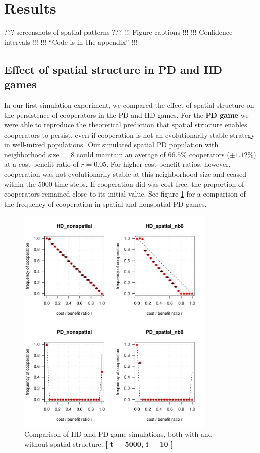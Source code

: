 
\section{Results}

??? screenshots of spatial patterns ???
!!! Figure captions !!!
!!! Confidence intervals !!!
!!! ``Code is in the appendix'' !!!

\subsection{Effect of spatial structure in PD and HD games}

In our first simulation experiment, we compared the effect of spatial structure on the persistence of cooperators in the PD and HD games. For the \textbf{PD game} we were able to reproduce the theoretical prediction that spatial structure enables cooperators to persist, even if cooperation is not an evolutionarily stable strategy in well-mixed populations. Our simulated spatial PD population with neighborhood size $= 8$ could maintain an average of $66.5\%$ cooperators ($\pm 1.12 \%$) at a cost-benefit ratio of $r = 0.05$. For higher cost-benefit ratios, however, cooperation was not evolutionarily stable at this neighborhood size and ceased within the 5000 time steps. If cooperation did was cost-free, the proportion of cooperators remained close to its initial value. See figure \ref{fig: task1_4plot} for a comparison of the frequency of cooperation in spatial and nonspatial PD games.




\begin{figure}[H]
	\centering 
	\includegraphics[width=9.5cm]{task1_4plot}
	\caption{Comparison of HD and PD game simulations, both with and without spatial structure.  \textbf{[ t = 5000, i = 10 ]} }\label{fig: task1_4plot}
\end{figure}

